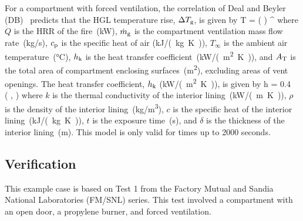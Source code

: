 For a compartment with forced ventilation, the correlation of Deal and Beyler (DB)~\cite{SFPE:Walton} predicts that the HGL temperature rise, $\Delta T\sb{g}$, is given by
\be
\Delta T = \left(  \right) \quad ^
\label{eq:DB}
\ee
where $\dot Q$ is the HRR of the fire~(\si{kW}), $\dot m\sb{g}$ is the compartment ventilation mass flow rate~(\si{kg/s}), $c\sb{p}$ is the specific heat of air (\si{kJ/(kg.K)}), $T_\infty$ is the ambient air temperature~(\si{\celsius}), $h\sb{k}$ is the heat transfer coefficient~(\si{kW/(m^2.K)}), and $A\sb{T}$ is the total area of compartment enclosing surfaces~(\si{m^2}), excluding areas of vent openings. The heat transfer coefficient, $h\sb{k}$ (\si{kW/(m^2.K)}), is given by
\be
h = 0.4\  \left(  ,  \right)
\label{eq:DB_hk}
\ee
where $k$ is the thermal conductivity of the interior lining~(\si{kW/(m.K)}), $\rho$ is the density of the interior lining~(\si{kg/m^3}), $c$ is the specific heat of the interior lining~(\si{kJ/(kg.K)}), $t$ is the exposure time~(\si{\second}), and $\delta$ is the thickness of the interior lining~(\si{m}). This model is only valid for times up to 2000 seconds.


\clearpage


\subsection*{Verification}

This example case is based on Test 1 from the Factory Mutual and Sandia National Laboratories (FM/SNL) series. This test involved a compartment with an open door, a propylene burner, and forced ventilation.


